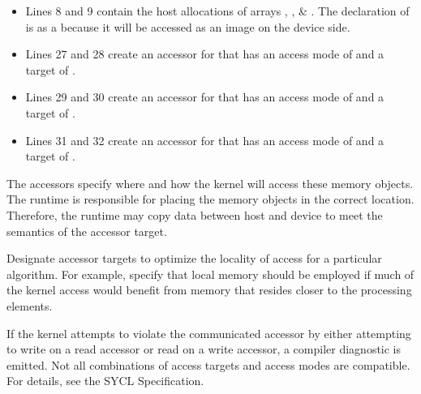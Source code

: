 \documentclass[letterpaper,10pt,english]{sphinxmanual}
\begin{document}
\begin{itemize}
\item {} 
Lines 8 and 9 contain the host allocations of arrays , , \&
. The declaration of  is as a  because it will be
accessed as an image on the device side.

\item {} 
Lines 27 and 28 create an accessor for  that has an
access mode of  and a target of .

\item {} 
Lines 29 and 30 create an accessor for  that has an
access mode of  and a target of .

\item {} 
Lines 31 and 32 create an accessor for  that has an
access mode of  and a target of .

\end{itemize}

The accessors specify where and how the kernel will access these memory
objects. The runtime is responsible for placing the memory objects in
the correct location. Therefore, the runtime may copy data between host
and device to meet the semantics of the accessor target.

Designate accessor targets to optimize the locality of access for a
particular algorithm. For example, specify that local memory should be
employed if much of the kernel access would benefit from memory that
resides closer to the processing elements.

If the kernel attempts to violate the communicated accessor by either
attempting to write on a read accessor or read on a write accessor, a
compiler diagnostic is emitted. Not all combinations of access targets
and access modes are compatible. For details, see the SYCL
Specification.
\end{document}
